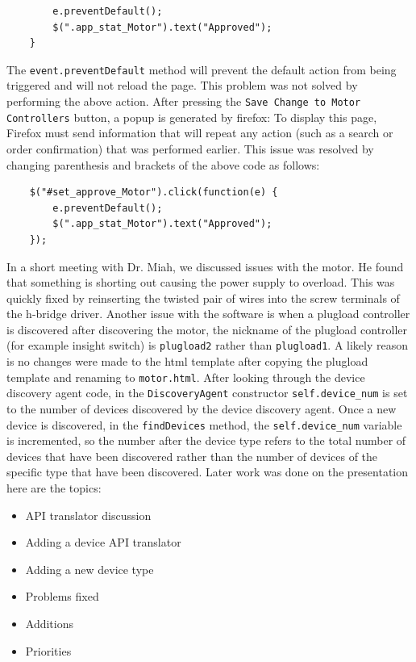 \documentclass[fontsize=11pt, %
                             paper=letter, %
                             twoside, %
                             captions=tableheading,
                             index=totoc,
                             hyperref]{labbook}
\begin{document}
\begin{addmargin}[0cm]{0cm}
\begin{verbatim}
        e.preventDefault();
        $(".app_stat_Motor").text("Approved");
    }
\end{verbatim}
The \texttt{event.preventDefault} method will prevent the default action from being triggered and will not reload the page. This problem was not solved by performing the above action. After pressing the \texttt{Save Change to Motor Controllers} button, a popup is generated by firefox: 
\bigbreak\noindent
To display this page, Firefox must send information that will repeat any action (such as a search or order confirmation) that was performed earlier.
\bigbreak\noindent
This issue was resolved by changing parenthesis and brackets of the above code as follows:
\begin{verbatim}
    $("#set_approve_Motor").click(function(e) {
        e.preventDefault();
        $(".app_stat_Motor").text("Approved");
    });
\end{verbatim}

In a short meeting with Dr. Miah, we discussed issues with the motor. He found that something is shorting out causing the power supply to overload. This was quickly fixed by reinserting the twisted pair of wires into the screw terminals of the h-bridge driver.
\bigbreak\noindent
Another issue with the software is when a plugload controller is discovered after discovering the motor, the nickname of the plugload controller (for example insight switch) is \texttt{plugload2} rather than \texttt{plugload1}. A likely reason is no changes were made to the html template after copying the plugload template and renaming to \texttt{motor.html}. After looking through the device discovery agent code, in the  \texttt{DiscoveryAgent} constructor \texttt{self.device\_num} is set to the number of devices discovered by the device discovery agent. Once a new device is discovered, in the \texttt{findDevices} method, the \texttt{self.device\_num} variable is incremented, so the number after the device type refers to the total number of devices that have been discovered rather than the number of devices of the specific type that have been discovered. Later work was done on the presentation here are the topics:
\begin{itemize}
	\item API translator discussion
	\item Adding a device API translator
	\item Adding a new device type
	\item Problems fixed
	\item Additions
	\item Priorities
\end{itemize}


\end{addmargin}
\end{document}
